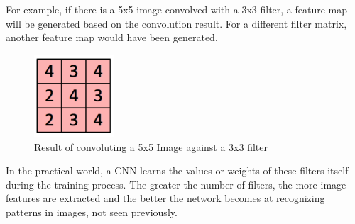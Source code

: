 For example, if there is a 5x5 image convolved with a 3x3 filter, a feature map will be generated based on the convolution result. For a different filter matrix, another feature map would have been generated.\newline\newline
\begin{figure}[h!]
\centering
\includegraphics[width=3cm]{figures/Convolution_Result.png}
\caption{Result of convoluting a 5x5 Image against a 3x3 filter}
\label{fig:cnn9}
\end{figure}
In the practical world, a CNN learns the values or weights of these filters itself during the training process. The greater the number of filters, the more image features are extracted and the better the network becomes at recognizing patterns in images, not seen previously.

